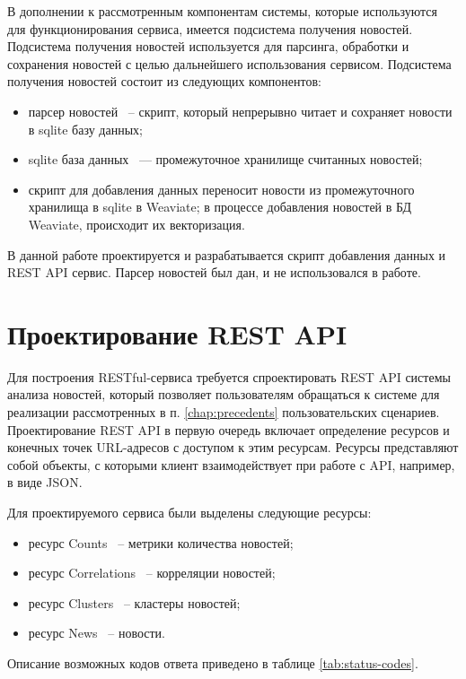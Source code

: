 В дополнении к рассмотренным компонентам системы, которые используются для функционирования сервиса, имеется подсистема получения новостей. Подсистема получения новостей используется для парсинга, обработки и сохранения новостей с целью дальнейшего использования сервисом. Подсистема получения новостей состоит из следующих компонентов:
\begin{itemize}
    \item парсер новостей ~-- скрипт, который непрерывно читает и сохраняет новости в sqlite базу данных;
    \item sqlite база данных ~--- промежуточное хранилище считанных новостей;
    \item скрипт для добавления данных переносит новости из промежуточного хранилища в sqlite в Weaviate; в процессе добавления новостей в БД Weaviate, происходит их векторизация.
\end{itemize}

В данной работе проектируется и разрабатывается скрипт добавления данных и REST API сервис. Парсер новостей был дан, и не использовался в работе.

\section{Проектирование REST API}

Для построения RESTful-сервиса требуется спроектировать REST API системы анализа новостей, который позволяет пользователям обращаться к системе для реализации рассмотренных в п. \ref{chap:precedents} пользовательских сценариев. Проектирование REST API в первую очередь включает определение ресурсов и конечных точек URL-адресов с доступом к этим ресурсам. Ресурсы представляют собой объекты, с которыми клиент взаимодействует при работе с API, например, в виде JSON.

Для проектируемого сервиса были выделены следующие ресурсы:
\begin{itemize}
    \item ресурс Counts ~-- метрики количества новостей;
    \item ресурс Correlations ~-- корреляции новостей;
    \item ресурс Clusters ~-- кластеры новостей;
    \item ресурс News ~-- новости.
\end{itemize}

Описание возможных кодов ответа приведено в таблице \ref{tab:status-codes}.

